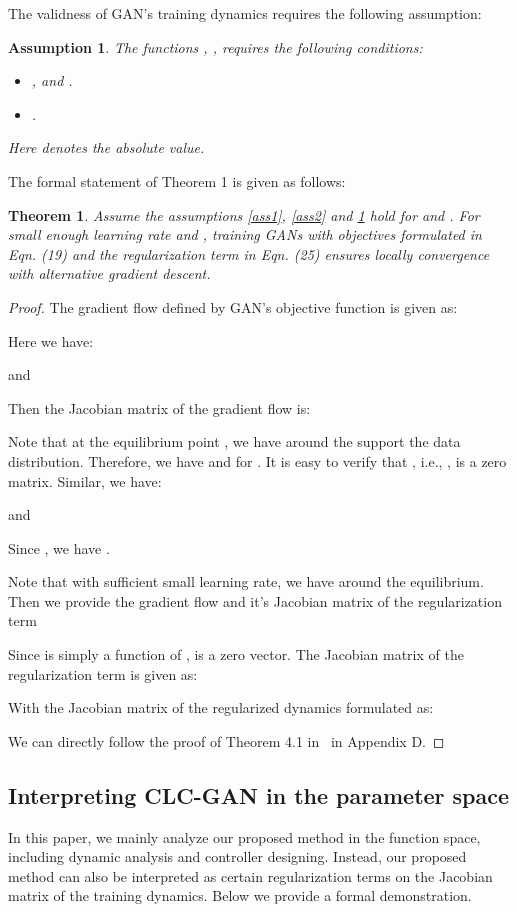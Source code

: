 \documentclass{article}
\newtheorem{assumption}{Assumption}
\newtheorem{theorem}{Theorem}
\theoremstyle{definition}
\begin{document}
The validness of GAN's training dynamics requires the following assumption:
\begin{assumption}
	The functions , ,  requires the following conditions:
	\begin{itemize}
		\item ,  and .
		\item .
	\end{itemize}
	Here  denotes the absolute value.
	\label{ass3}
\end{assumption}


The formal statement of Theorem 1 is given as follows:
\setcounter{theorem}{0}
\begin{theorem}
	Assume the assumptions \ref{ass1}, \ref{ass2} and \ref{ass3} hold for  and . For small enough learning rate and , training GANs with objectives formulated in Eqn. (19) and the regularization term in Eqn. (25) ensures locally convergence with alternative gradient descent.
\end{theorem}

\begin{proof}
	The gradient flow defined by GAN's objective function is given as:
	
	Here we have:
	
	and 
	
	
	Then the Jacobian matrix of the gradient flow is:
		
	Note that at the equilibrium point , we have  around the support the data distribution. Therefore, we have  and  for . It is easy to verify that , i.e., , is a zero matrix. Similar, we have:
	
	and
	
	Since , we have .
		
	Note that with sufficient small learning rate, we have  around the equilibrium. Then we provide the gradient flow and it's Jacobian matrix of the regularization term 
	
	Since  is simply a function of ,  is a zero vector. The Jacobian matrix of the regularization term is given as:
	
	
	With the Jacobian matrix of the regularized dynamics formulated as:
	
	We can directly follow the proof of Theorem 4.1 in~\citet{mescheder2018training} in Appendix D.
\end{proof}



\subsection{Interpreting CLC-GAN in the parameter space}
In this paper, we mainly analyze our proposed method in the function space, including dynamic analysis and controller designing. Instead, our proposed method can also be interpreted as certain regularization terms on the Jacobian matrix of the training dynamics. Below we provide a formal demonstration.
\end{document}

